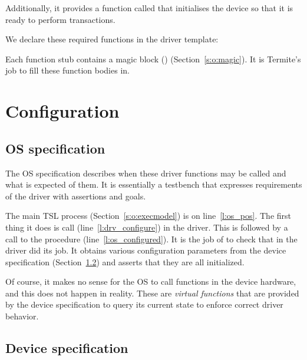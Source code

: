 Additionally, it provides a function called  that initialises the device so that it is ready to perform transactions.

We declare these required functions in the driver template:
\vspace*{5mm}

\vspace*{5mm}

Each function stub contains a magic block () (Section~\ref{s:o:magic}). It is Termite's job to fill these function bodies in.

\section{Configuration}

\subsection{OS specification}

The OS specification describes when these driver functions may be called and what is expected of them. It is essentially a testbench that expresses requirements of the driver with assertions and goals.

\vspace*{5mm}

\vspace*{5mm}

The main TSL process (Section~\ref{s:o:execmodel}) is on line~\ref{l:os_pos}. The first thing it does is call  (line~\ref{l:drv_configure}) in the driver. This is followed by a call to the procedure  (line~\ref{l:os_configured}). It is the job of  to check that  in the driver did its job. It obtains various configuration parameters from the device specification (Section~\ref{a:sec:dev_spec}) and asserts that they are all initialized. 
        
Of course, it makes no sense for the OS to call functions in the device hardware, and this does not happen in reality. These are \emph{virtual functions} that are provided by the device specification to query its current state to enforce correct driver behavior. 

\subsection{Device specification}
\label{a:sec:dev_spec}

